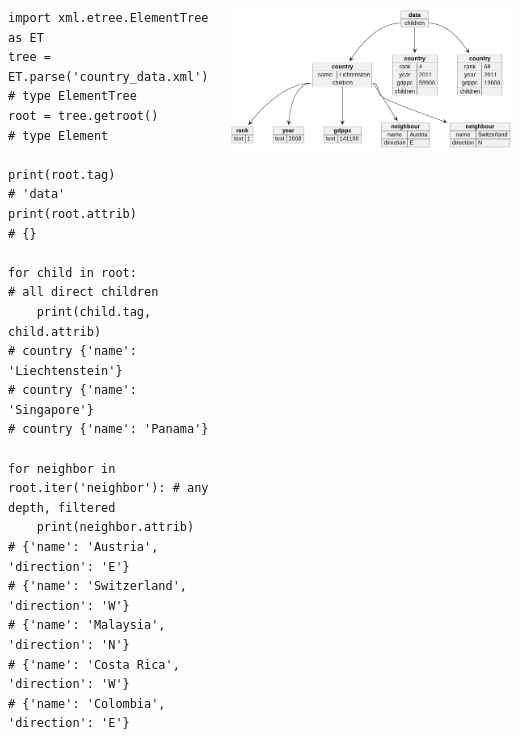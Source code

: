 
\begin{frame}[fragile]
%
\vspace{-0.7cm}
\begin{columns}
\begin{codebox}
\begin{verbatim}
import xml.etree.ElementTree as ET
tree = ET.parse('country_data.xml')    # type ElementTree
root = tree.getroot()                  # type Element

print(root.tag)                        # 'data'
print(root.attrib)                     # {}

for child in root:                     # all direct children
    print(child.tag, child.attrib)
# country {'name': 'Liechtenstein'}
# country {'name': 'Singapore'}
# country {'name': 'Panama'}

for neighbor in root.iter('neighbor'): # any depth, filtered
    print(neighbor.attrib)
# {'name': 'Austria', 'direction': 'E'}
# {'name': 'Switzerland', 'direction': 'W'}
# {'name': 'Malaysia', 'direction': 'N'}
# {'name': 'Costa Rica', 'direction': 'W'}
# {'name': 'Colombia', 'direction': 'E'}
\end{verbatim}
\end{codebox}
%
\vspace{1cm}
\includegraphics[width=\linewidth, trim={2cm 2cm 12cm 2cm}, clip]{./gfx/22-xml-countries}
\end{columns}
%
\end{frame}


